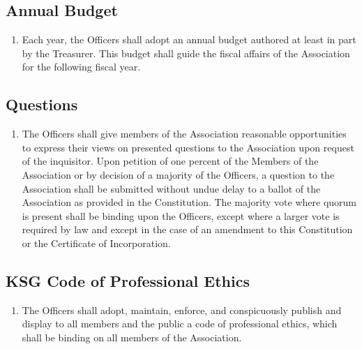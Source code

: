 \documentclass[12pt,letterpaper]{article}
\begin{document}
\subsection{Annual Budget}
\begin{enumerate}
  \item Each year, the Officers shall adopt an annual budget authored at least in
        part by the Treasurer. This budget shall guide the fiscal affairs of the
        Association for the following fiscal year.
\end{enumerate}

\subsection{Questions}
\begin{enumerate}
  \item The Officers shall give members of the Association reasonable opportunities
        to express their views on presented questions to the Association upon request
        of the inquisitor. Upon petition of one percent of the Members of the
        Association or by decision of a majority of the Officers, a question to the
        Association shall be submitted without undue delay to a ballot of the
        Association as provided in the Constitution. The majority vote where quorum is
        present shall be binding upon the Officers, except where a larger vote is
        required by law and except in the case of an amendment to this Constitution
        or the Certificate of Incorporation.
\end{enumerate}

\subsection{KSG Code of Professional Ethics}
\begin{enumerate}
  \item The Officers shall adopt, maintain, enforce, and conspicuously publish and
        display to all members and the public a code of professional ethics, which
        shall be binding on all members of the Association.
\end{enumerate}
\end{document}
